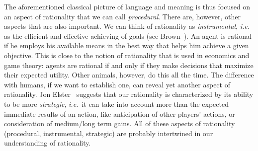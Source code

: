 \documentclass[a4paper]{article}
\begin{document}
The aforementioned classical picture of language and meaning is thus focused on an aspect of rationality that we can call \emph{procedural}.
There are, however, other aspects that are also important.
We can think of rationality as \emph{instrumental}, \emph{i.e.} as the efficient and effective achieving of goals (see Brown~\parencite*[???]{brown_rationality_1990}).
An agent is rational if he employs his available means in the best way that helps him achieve a given objective.
This is close to the notion of rationality that is used in economics and game theory: agents are rational if and only if they make decisions that maximize their expected utility.
Other animals, however, do this all the time.
The difference with humans, if we want to establish one, can reveal yet another aspect of rationality.
Jon Elster~\parencite*{elster_ulysses_1979} suggests that our rationality is characterized by its ability to be more \emph{strategic}, \emph{i.e.}~it can take into account more than the expected immediate results of an action, like anticipation of other players' actions, or consideration of medium/long term gains.
All of these aspects of rationality (procedural, instrumental, strategic) are probably intertwined in our understanding of rationality.
\end{document}
